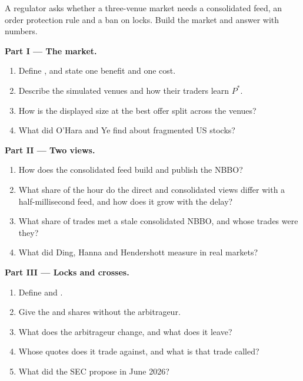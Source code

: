 \begin{problem}\label{pb:mx:fragmentation-and-routing:1}
A regulator asks whether a three-venue market needs a consolidated feed, an order protection rule and a ban on locks. Build the market and answer with
numbers.

\medskip\noindent\textbf{Part I --- The market.}
\begin{enumerate}
\item Define , and state one benefit and one cost.
\item Describe the simulated venues and how their traders learn $P^\ast$.
\item How is the displayed size at the best offer split across the venues?
\item What did O'Hara and Ye find about fragmented US stocks?
\end{enumerate}

\medskip\noindent\textbf{Part II --- Two views.}
\begin{enumerate}[resume]
\item How does the consolidated feed build and publish the NBBO?
\item What share of the hour do the direct and consolidated views differ with a half-millisecond feed, and how does it grow with the delay?
\item What share of trades met a stale consolidated NBBO, and whose trades were they?
\item What did Ding, Hanna and Hendershott measure in real markets?
\end{enumerate}

\medskip\noindent\textbf{Part III --- Locks and crosses.}
\begin{enumerate}[resume]
\item Define  and .
\item Give the  and  shares without the arbitrageur.
\item What does the arbitrageur change, and what does it leave?
\item Whose quotes does it trade against, and what is that trade called?
\item What did the SEC propose in June 2026?
\end{enumerate}


\end{problem}
